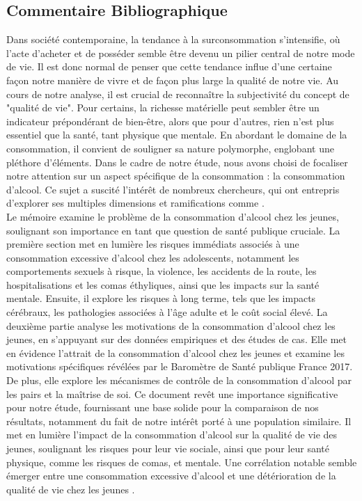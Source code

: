 \documentclass{article}
\begin{document}
\subsection{Commentaire Bibliographique}
Dans société contemporaine, la tendance à la surconsommation s'intensifie, où l'acte d'acheter et de posséder semble être devenu un pilier central de notre mode de vie. Il est donc normal de penser que cette tendance influe d'une certaine façon notre manière de vivre et de façon plus large la qualité de notre vie. Au cours de notre analyse, il est crucial de reconnaître la subjectivité du concept de "qualité de vie". Pour certains, la richesse matérielle peut sembler être un indicateur prépondérant de bien-être, alors que pour d'autres, rien n'est plus essentiel que la santé, tant physique que mentale. En abordant le domaine de la consommation, il convient de souligner sa nature polymorphe, englobant une pléthore d'éléments. Dans le cadre de notre étude, nous avons choisi de focaliser notre attention sur un aspect spécifique de la consommation : la consommation d'alcool. Ce sujet a suscité l'intérêt de nombreux chercheurs, qui ont entrepris d'explorer ses multiples dimensions et ramifications comme \cite{article1}. \\


Le mémoire examine le problème de la consommation d'alcool chez les jeunes, soulignant son importance en tant que question de santé publique cruciale. La première section met en lumière les risques immédiats associés à une consommation excessive d'alcool chez les adolescents, notamment les comportements sexuels à risque, la violence, les accidents de la route, les hospitalisations et les comas éthyliques, ainsi que les impacts sur la santé mentale. Ensuite, il explore les risques à long terme, tels que les impacts cérébraux, les pathologies associées à l'âge adulte et le coût social élevé.
La deuxième partie analyse les motivations de la consommation d'alcool chez les jeunes, en s'appuyant sur des données empiriques et des études de cas. Elle met en évidence l'attrait de la consommation d'alcool chez les jeunes et examine les motivations spécifiques révélées par le Baromètre de Santé publique France 2017. De plus, elle explore les mécanismes de contrôle de la consommation d'alcool par les pairs et la maîtrise de soi.
Ce document revêt une importance significative pour notre étude, fournissant une base solide pour la comparaison de nos résultats, notamment du fait de notre intérêt porté à une population similaire. Il met en lumière l'impact de la consommation d'alcool sur la qualité de vie des jeunes, soulignant les risques pour leur vie sociale, ainsi que pour leur santé physique, comme les risques de comas, et mentale. Une corrélation notable semble émerger entre une consommation excessive d'alcool et une détérioration de la qualité de vie chez les jeunes \cite{article2}. \\
\end{document}
